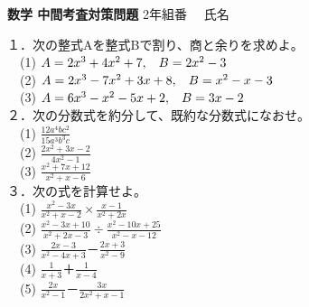 \documentclass[a4paper,landscape,10pt,fleqn]{jsarticle}
\begin{document}
		\begin{flushleft}
		\Large\textbf{数学 中間考査対策問題}\hspace{3mm}
		2年\underline{\hspace{10mm}}組\underline{\hspace{10mm}}番
		　氏名\underline{\hspace{40mm}}
		\end{flushleft}

１．次の整式Aを整式Bで割り、商と余りを求めよ。\vspace{2mm}\\
　(1) $A=2x^3+4x^2+7, \hspace{3mm}B=2x^2-3$
\vspace{3mm}\\
　(2) $A=2x^3-7x^2+3x+8, \hspace{3mm}B=x^2-x-3$
\vspace{3mm}\\
　(3) $A=6x^3-x^2-5x+2, \hspace{3mm}B=3x-2$
\vspace{6mm}\\

２．次の分数式を約分して、既約な分数式になおせ。\vspace{2mm}\\
　(1) $\displaystyle \frac{12a^4bc^2}{15a^3b^3c}$
\vspace{3mm}\\
　(2) $\displaystyle \frac{2x^2+3x-2}{4x^2-1}$
\vspace{3mm}\\
　(3) $\displaystyle \frac{x^2+7x+12}{x^2+x-6}$
\vspace{6mm}\\

３．次の式を計算せよ。\vspace{2mm}\\
　(1) $\displaystyle \frac{x^2-3x}{x^2+x-2}×\frac{x-1}{x^2+2x}$
\vspace{3mm}\\
　(2) $\displaystyle \frac{x^2-3x+10}{x^2+2x-3} ÷\frac{x^2-10x+25}{x^2-x-12}$
\vspace{3mm}\\
　(3) $\displaystyle \frac{2x-3}{x^2-4x+3}－\frac{2x+3}{x^2-9}$
\vspace{3mm}\\
　(4) $\displaystyle \frac{1}{x+3}＋\frac{1}{x-4}$
\vspace{3mm}\\
　(5) $\displaystyle \frac{2x}{x^2-1}－\frac{3x}{2x^2+x-1}$
\newpage
\end{document}
